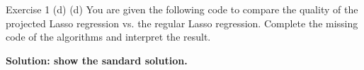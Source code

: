 \documentclass[aspectratio=169]{beamer}
\begin{document}
\begin{frame}{Exercise 1 (d)}
	(d) You are given the following code to compare the quality of the projected Lasso regression vs. the regular Lasso regression. Complete the missing code of the algorithms and interpret the result.
	\vspace{20pt}
	
	\textbf{Solution: show the sandard solution.}
\end{frame}
\end{document}
